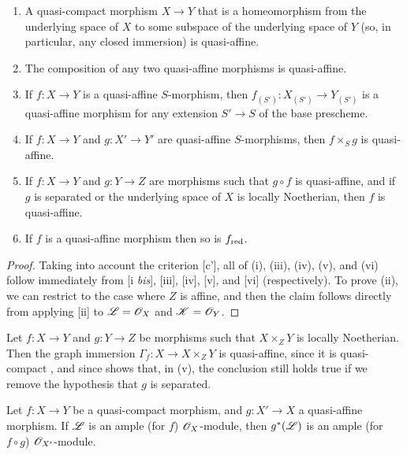 \begin{prop}[5.1.10]
\label{2.5.1.10}
\medskip\noindent
\begin{enumerate}[label=\emph{(\roman*)}]
  \item A quasi-compact morphism $X\to Y$ that is a homeomorphism from the underlying space of $X$ to some subspace of the underlying space of $Y$ (so, in particular, any closed immersion) is quasi-affine.
  \item The composition of any two quasi-affine morphisms is quasi-affine.
  \item If $f:X\to Y$ is a quasi-affine $S$-morphism, then $f_{(S')}:X_{(S')}\to Y_{(S')}$ is a quasi-affine morphism for any extension $S'\to S$ of the base prescheme.
  \item If $f:X\to Y$ and $g:X'\to Y'$ are quasi-affine $S$-morphisms, then $f\times_S g$ is quasi-affine.
  \item If $f:X\to Y$ and $g:Y\to Z$ are morphisms such that $g\circ f$ is quasi-affine, and if $g$ is separated or the underlying space of $X$ is locally Noetherian, then $f$ is quasi-affine.
  \item If $f$ is a quasi-affine morphism then so is $f_{\mathrm{red}}$.
\end{enumerate}
\end{prop}

\begin{proof}
\label{proof-2.5.1.10}
Taking into account the criterion [c'], all of (i), (iii), (iv), (v), and (vi) follow immediately from [i \emph{bis}], [iii], [iv], [v], and [vi] (respectively).
To prove (ii), we can restrict to the case where $Z$ is affine, and then the claim follows directly from applying [ii] to $\mathscr{L}=\mathscr{O}_X$ and $\mathscr{K}=\mathscr{O}_Y$.
\end{proof}

\begin{rmk}[5.1.11]
Let $f:X\to Y$ and $g:Y\to Z$ be morphisms such that $X\times_Z Y$ is locally Noetherian.
Then the graph immersion $\Gamma_f:X\to X\times_Z Y$ is quasi-affine, since it is quasi-compact , and since  shows that, in (v), the conclusion still holds true if we remove the hypothesis that $g$ is separated.
\end{rmk}

\begin{prop}[5.1.12]
\label{2.5.1.12}
Let $f:X\to Y$ be a quasi-compact morphism, and $g:X'\to X$ a quasi-affine morphism.
If $\mathscr{L}$ is an ample (for $f$) $\mathscr{O}_X$-module, then $g^*(\mathscr{L})$ is an ample (for $f\circ g$) $\mathscr{O}_{X'}$-module.
\end{prop}

